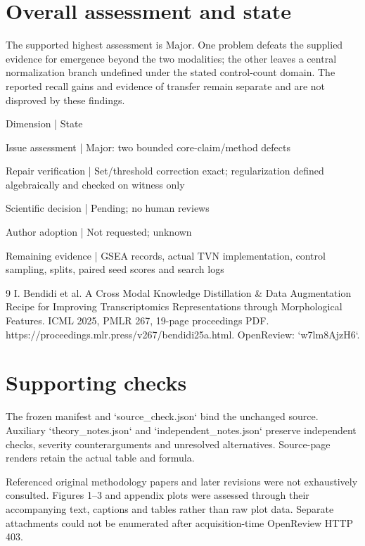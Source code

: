 \documentclass[10pt]{article}
\begin{document}
\section*{Overall assessment and state}
The supported highest assessment is Major. One problem defeats the supplied evidence for emergence beyond the two modalities; the other leaves a central normalization branch undefined under the stated control-count domain. The reported recall gains and evidence of transfer remain separate and are not disproved by these findings.\par
Dimension | State\par
Issue assessment | Major: two bounded core-claim/method defects\par
Repair verification | Set/threshold correction exact; regularization defined algebraically and checked on witness only\par
Scientific decision | Pending; no human reviews\par
Author adoption | Not requested; unknown\par
Remaining evidence | GSEA records, actual TVN implementation, control sampling, splits, paired seed scores and search logs\par
9 I. Bendidi et al. A Cross Modal Knowledge Distillation \& Data Augmentation Recipe for Improving Transcriptomics Representations through Morphological Features. ICML 2025, PMLR 267, 19-page proceedings PDF. https://proceedings.mlr.press/v267/bendidi25a.html. OpenReview: `w7lm8AjzH6`.\par
\section*{Supporting checks}
The frozen manifest and `source\_check.json` bind the unchanged source. Auxiliary `theory\_notes.json` and `independent\_notes.json` preserve independent checks, severity counterarguments and unresolved alternatives. Source-page renders retain the actual table and formula.\par
Referenced original methodology papers and later revisions were not exhaustively consulted. Figures 1–3 and appendix plots were assessed through their accompanying text, captions and tables rather than raw plot data. Separate attachments could not be enumerated after acquisition-time OpenReview HTTP 403.\par
\end{document}
